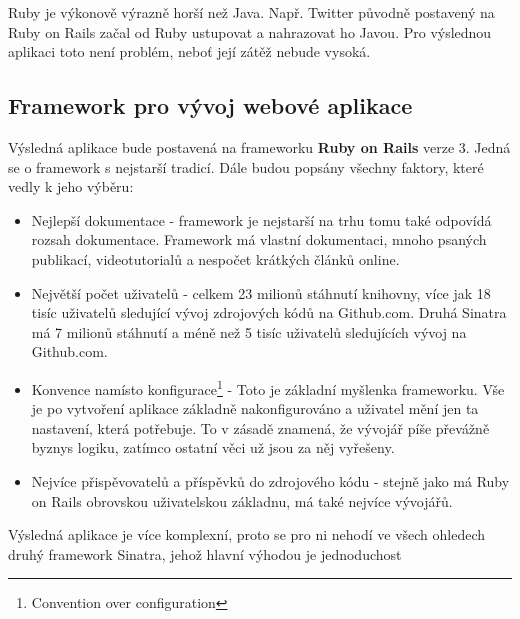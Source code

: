 Ruby je výkonově výrazně horší než Java\cite{website:java-ruby-performance}. Např. Twitter původně postavený na Ruby on Rails začal od Ruby ustupovat a nahrazovat ho Javou\cite{website:twitter-ruby-java}. Pro výslednou aplikaci toto není problém, neboť její zátěž nebude vysoká.

\subsection{Framework pro vývoj webové aplikace}
Výsledná aplikace bude postavená na frameworku \textbf{Ruby on Rails} verze 3. Jedná se o framework s nejstarší tradicí. Dále budou popsány všechny faktory, které vedly k jeho výběru:

\begin{itemize}
\item Nejlepší dokumentace - framework je nejstarší na trhu tomu také odpovídá rozsah dokumentace. Framework má vlastní dokumentaci, mnoho psaných publikací, videotutorialů a nespočet krátkých článků online\cite{website:ruby-toolbox-web}\cite{website:ruby-rails-documentation}.
\item Největší počet uživatelů - celkem 23 milionů stáhnutí knihovny, více jak 18 tisíc uživatelů sledující vývoj zdrojových kódů na Github.com. Druhá Sinatra má 7 milionů stáhnutí a méně než 5 tisíc uživatelů sledujících vývoj na Github.com\cite{website:ruby-toolbox-web}.
\item Konvence namísto konfigurace\footnote{Convention over configuration} - Toto je základní myšlenka frameworku. Vše je po vytvoření aplikace základně nakonfigurováno a uživatel mění jen ta nastavení, která potřebuje. To v zásadě znamená, že vývojář píše převážně byznys logiku, zatímco ostatní věci už jsou za něj vyřešeny.
\item Nejvíce přispěvovatelů a příspěvků do zdrojového kódu - stejně jako má Ruby on Rails obrovskou uživatelskou základnu, má také nejvíce vývojářů\cite{website:ruby-toolbox-web}.
\end{itemize}

Výsledná aplikace je více komplexní, proto se pro ni nehodí ve všech ohledech druhý framework Sinatra, jehož hlavní výhodou je jednoduchost \cite{harris2011sinatra}

